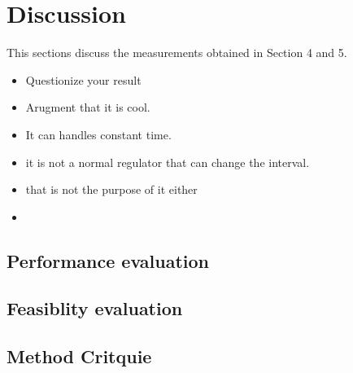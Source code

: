\section{Discussion}
This sections discuss the measurements obtained in Section 4 and 5.
\begin{itemize}
\item Questionize your result
\item Arugment that it is cool.
\item It can handles constant time.
\item it is not a normal regulator that can change the interval.
\item that is not the purpose of it either
\item 
\end{itemize}

\subsection{Performance evaluation}
\subsection{Feasiblity evaluation}
\subsection{Method Critquie}
